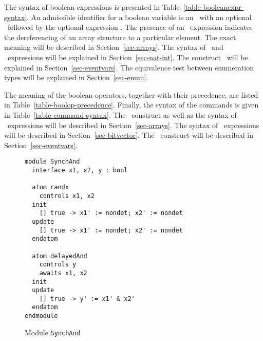 \noindent 
The syntax of boolean expressions is presented in Table~\ref{table-booleanexpr-syntax}.
An admissible identifier for a boolean variable is an \ident\ with an optional \nextop\
followed by the optional expression \arefer.
The presence of an \arefer\ expression indicates the dereferencing of an array structure to a particular element.
The exact meaning will be described in Section~\ref{sec-arrays}.
The syntax of \intrangeexpr\ and \natexpr\ expressions will be explained in Section~\ref{sec-nat-int}.
The construct \eventvar\QUESTIONMARK\ will be explained in Section~\ref{sec-eventvars}.
The equivalence test between enumeration types will be explained in Section~\ref{sec-enum}.

The meaning of the boolean operators, together with their precedence,
are listed in Table~\ref{table-boolop-precedence}.
Finally, the syntax of the commands is given in Table~\ref{table-command-syntax}.
The \FORALL\ construct as well as the syntax of \aassign\ expressions will be described in Section~\ref{sec-arrays}.
The syntax of \bitexpr\ expressions will be described in Section~\ref{sec-bitvector}.
The \eventvar\EXCLAMATION\ construct will be described in Section~\ref{sec-eventvars}.

\begin{figure}
\begin{verbatim}
module SynchAnd
  interface x1, x2, y : bool

  atom randx
    controls x1, x2
  init
    [] true -> x1' := nondet; x2' := nondet
  update 
    [] true -> x1' := nondet; x2' := nondet
  endatom

  atom delayedAnd
    controls y
    awaits x1, x2
  init
  update 
    [] true -> y' := x1' & x2'
  endatom
endmodule 
\end{verbatim}
\caption{Module {\tt SynchAnd}}
\label{fig-synchand} 
\end{figure}

